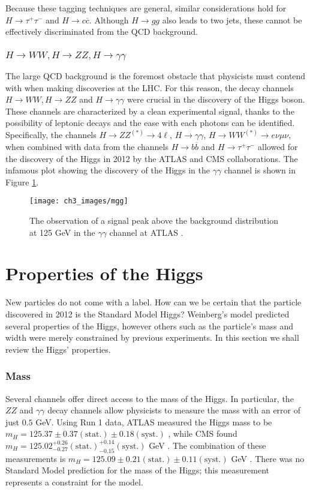 \documentclass[10pt,a4paper]{book}
\begin{document}
Because these tagging techniques are general, similar considerations hold for $H \rightarrow \tau^+ \tau^-$ and $H \rightarrow c \overline{c}$. Although $H \rightarrow g g$ also leads to two jets, these cannot be effectively discriminated from the QCD background.

\subsubsection{$H\rightarrow WW, H\rightarrow ZZ, H\rightarrow \gamma\gamma$}
The large QCD background is the foremost obstacle that physicists must contend with when making discoveries at the LHC. For this reason, the decay channels  
$H\rightarrow WW, H\rightarrow ZZ$ and $H\rightarrow \gamma\gamma$ were crucial in the discovery of the Higgs boson. These channels are characterized by a clean experimental signal, thanks to the possibility of leptonic decays and the ease with each photons can be identified. Specifically, the channels $H\rightarrow ZZ^{(*)}\rightarrow 4\ell$, $H\rightarrow\gamma\gamma$, $H\rightarrow WW^{(*)} \rightarrow e\nu\mu\nu$, when combined with data from the channels $H\rightarrow b\overline{b}$ and $H \rightarrow \tau^+ \tau^-$ allowed for the discovery of the Higgs in 2012 by the ATLAS and CMS collaborations. The infamous plot showing the discovery of the Higgs in the $\gamma\gamma$ channel is shown in Figure \ref{mgg}.

\begin{figure}
\centering
\texttt{[image: ch3\_images/mgg]}
\caption{The observation of a signal peak above the background distribution at 125 GeV in the $\gamma\gamma$ channel at ATLAS \cite{ATLAS:2012yve}.}
\label{mgg}
\end{figure}

\section{Properties of the Higgs}
New particles do not come with a label. How can we be certain that the particle discovered in 2012 is the Standard Model Higgs? Weinberg's model predicted several properties of the Higgs, however others such as the particle's mass and width were merely constrained by previous experiments. In this section we shall review the Higgs' properties.

\subsubsection{Mass}
Several channels offer direct access to the mass of the Higgs. In particular, the $ZZ$ and $\gamma\gamma$ decay channels allow physicists to measure the mass with an error of just $0.5$ GeV. Using Run 1 data, ATLAS measured the Higgs mass to be $m_H = 125.37 \pm 0.37(\text{stat.}) \pm 0.18(\text{syst.})$ \cite{ATLAS:2014euz}, while CMS found $m_H = 125.02^{+0.26}_{-0.27}(\text{stat.})^{+0.14}_{-0.15}(\text{syst.})$ GeV \cite{CMS:2014fzn}. The combination of these measurements is $m_H = 125.09 \pm 0.21(\text{stat.})\pm 0.11(\text{syst.})$ GeV \cite{ATLAS:2015yey}.  There was no Standard Model prediction for the mass of the Higgs; this measurement represents a constraint for the model.
\end{document}
